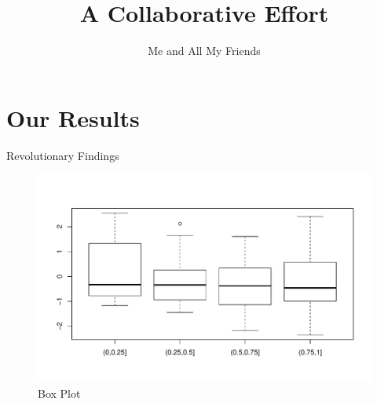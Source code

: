 \documentclass[11pt,english]{article}
\begin{document}
\title{
A Collaborative Effort
}

\author{Me and All My Friends}

\maketitle

\clearpage

\section{Our Results}

\begin{table}[H]
\centering

\label{tab:main_results}
\caption{Revolutionary Findings}
\end{table}

\begin{figure}[H]
\centering
\includegraphics[width=\textwidth]{figures/boxplot.pdf}
\caption{Box Plot}
\label{fig:box_plot}
\end{figure}
\end{document}
